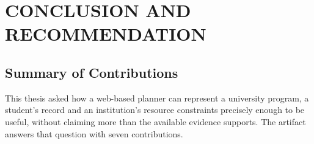 \chapter{CONCLUSION AND RECOMMENDATION}

\label{ch:conclusion}

\section{Summary of Contributions}

This thesis asked how a web-based planner can represent a university program, a student's record
and an institution's resource constraints precisely enough to be useful, without claiming more than
the available evidence supports. The artifact answers that question with seven contributions.

